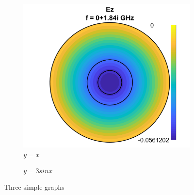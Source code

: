 \documentclass[12pt,oneside]{article}
\begin{document}
	\begin{figure}[h]
     	\centering
     	\begin{subfigure}[b]{0.4\textwidth}
         	\centering
         	\includegraphics[trim={0cm 0 0cm 0},clip, scale = 0.4]{magnitude6}
         	\caption{$y=x$}
         	\label{fig:y equals x}
     	\end{subfigure}
     	\hfill
     	\begin{subfigure}[b]{0.4\textwidth}
         	\centering
         	\caption{$y=3sinx$}
         	\label{fig:three sin x}
     	\end{subfigure}
     	\caption{Three simple graphs}
     	\label{fig:three graphs}
	\end{figure}
\end{document}
